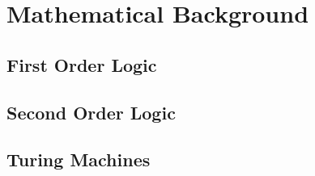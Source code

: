 \chapter{Mathematical Background}\label{ch:mathematical-background}

\section{First Order Logic}\label{sec:first-order-logic}

\section{Second Order Logic}\label{sec:second-order-logic}

\section{Turing Machines}\label{sec:turing-machines}
